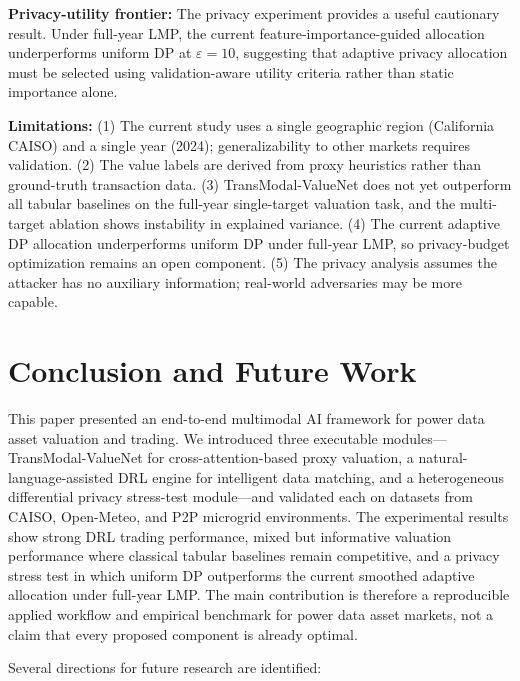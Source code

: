 \documentclass{ieeeaccess}
\begin{document}
\textbf{Privacy-utility frontier:} The privacy experiment provides a useful cautionary result. Under full-year LMP, the current feature-importance-guided allocation underperforms uniform DP at $\varepsilon=10$, suggesting that adaptive privacy allocation must be selected using validation-aware utility criteria rather than static importance alone.

\textbf{Limitations:} (1) The current study uses a single geographic region (California CAISO) and a single year (2024); generalizability to other markets requires validation. (2) The value labels are derived from proxy heuristics rather than ground-truth transaction data. (3) TransModal-ValueNet does not yet outperform all tabular baselines on the full-year single-target valuation task, and the multi-target ablation shows instability in explained variance. (4) The current adaptive DP allocation underperforms uniform DP under full-year LMP, so privacy-budget optimization remains an open component. (5) The privacy analysis assumes the attacker has no auxiliary information; real-world adversaries may be more capable.

\section{Conclusion and Future Work}
\label{sec:conclusion}

This paper presented an end-to-end multimodal AI framework for power data asset valuation and trading. We introduced three executable modules---TransModal-ValueNet for cross-attention-based proxy valuation, a natural-language-assisted DRL engine for intelligent data matching, and a heterogeneous differential privacy stress-test module---and validated each on datasets from CAISO, Open-Meteo, and P2P microgrid environments. The experimental results show strong DRL trading performance, mixed but informative valuation performance where classical tabular baselines remain competitive, and a privacy stress test in which uniform DP outperforms the current smoothed adaptive allocation under full-year LMP. The main contribution is therefore a reproducible applied workflow and empirical benchmark for power data asset markets, not a claim that every proposed component is already optimal.

Several directions for future research are identified:
\end{document}
